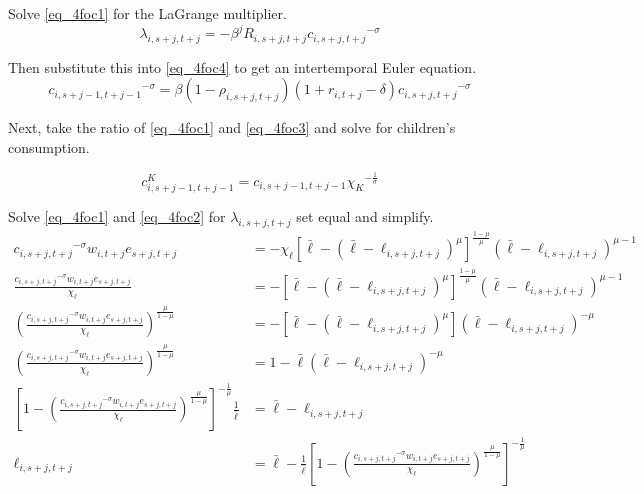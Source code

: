 \documentclass[letterpaper,12pt]{article}
\theoremstyle{definition}
\numberwithin{equation}{section}
\begin{document}
\begin{spacing}{1.5}
	Solve \eqref{eq_4foc1} for the LaGrange multiplier.
	\begin{equation}\label{eq_4lamdef}
	       \lambda_{i,s+j,t+j} = -\beta^j R_{i,s+j,t+j} {c_{i,s+j,t+j}}^{-\sigma}
	\end{equation}

	Then substitute this into \eqref{eq_4foc4} to get an intertemporal Euler equation.
	\begin{equation}
	       {c_{i,s+j-1,t+j-1}}^{-\sigma} = \beta (1-\rho_{i,s+j,t+j}) (1+r_{i,t+j}-\delta) {c_{i,s+j,t+j}}^{-\sigma}
	\end{equation}

	Next, take the ratio of \eqref{eq_4foc1} and \eqref{eq_4foc3} and solve for children's consumption.

	\begin{equation}
		c^K_{i,s+j-1,t+j-1} = c_{i,s+j-1,t+j-1} {\chi_K}^{-\frac{1}{\sigma}} \label{eq_4cKdef}
 	\end{equation}

	Solve \eqref{eq_4foc1} and \eqref{eq_4foc2} for $\lambda_{i,s+j,t+j}$ set equal and simplify.
	\begin{align}
		 {c_{i,s+j,t+j}}^{-\sigma} w_{i,t+j} e_{s+j,t+j}  & =  -\chi_\ell \left[ \bar \ell - (\bar \ell-\ell_{i,s+j,t+j})^\mu \right]^{\frac{1-\mu}{\mu}}(\bar \ell-\ell_{i,s+j,t+j})^{\mu-1}  \nonumber \\
		 \frac{{c_{i,s+j,t+j}}^{-\sigma} w_{i,t+j} e_{s+j,t+j}}{\chi_\ell} & = -\left[ \bar \ell - (\bar \ell-\ell_{i,s+j,t+j})^\mu \right]^{\frac{1-\mu}{\mu}}(\bar \ell-\ell_{i,s+j,t+j})^{\mu-1} \nonumber \\
		 \left(\frac{{c_{i,s+j,t+j}}^{-\sigma} w_{i,t+j} e_{s+j,t+j}}{\chi_\ell} \right)^{\frac{\mu}{1-\mu}} & = -\left[ \bar \ell - (\bar \ell-\ell_{i,s+j,t+j})^\mu \right](\bar \ell-\ell_{i,s+j,t+j})^{-\mu} \nonumber \\
		 \left(\frac{{c_{i,s+j,t+j}}^{-\sigma} w_{i,t+j} e_{s+j,t+j}}{\chi_\ell} \right)^{\frac{\mu}{1-\mu}} & = 1-\bar \ell(\bar \ell-\ell_{i,s+j,t+j})^{-\mu} \nonumber \\
		 \left[ 1-\left(\frac{{c_{i,s+j,t+j}}^{-\sigma} w_{i,t+j} e_{s+j,t+j}}{\chi_\ell} \right)^{\frac{\mu}{1-\mu}} \right]^{-\frac{1}{\mu}} \frac{1}{\bar \ell} & = \bar \ell-\ell_{i,s+j,t+j} \nonumber \\
		 \ell_{i,s+j,t+j} & = \bar \ell - \frac{1}{\bar \ell} \left[ 1-\left(\frac{{c_{i,s+j,t+j}}^{-\sigma} w_{i,t+j} e_{s+j,t+j}}{\chi_\ell} \right)^{\frac{\mu}{1-\mu}} \right]^{-\frac{1}{\mu}} \label{eq_4elldef}
	\end{align}


\end{spacing}
\end{document}
